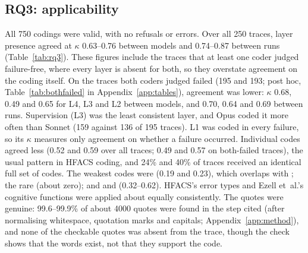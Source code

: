 \documentclass[11pt]{article}
\begin{document}
\subsection{RQ3: applicability}

All 750 codings were valid, with no refusals or errors. Over all 250 traces, layer presence agreed at $\kappa$ 0.63--0.76 between models and 0.74--0.87 between runs (Table~\ref{tab:rq3}). These figures include the traces that at least one coder judged failure-free, where every layer is absent for both, so they overstate agreement on the coding itself. On the traces both coders judged failed (195 and 193; post hoc, Table~\ref{tab:bothfailed} in Appendix~\ref{app:tables}), agreement was lower: $\kappa$ 0.68, 0.49 and 0.65 for L4, L3 and L2 between models, and 0.70, 0.64 and 0.69 between runs. Supervision (L3) was the least consistent layer, and Opus coded it more often than Sonnet (159 against 136 of 195 traces). L1 was coded in every failure, so its $\kappa$ measures only agreement on whether a failure occurred. Individual codes agreed less (0.52 and 0.59 over all traces; 0.49 and 0.57 on both-failed traces), the usual pattern in HFACS coding, and 24\% and 40\% of traces received an identical full set of codes. The weakest codes were  (0.19 and 0.23), which overlaps with
; the rare  (about zero); and  and 
(0.32--0.62). HFACS's error types and Ezell et~al.'s cognitive functions were
applied about equally consistently. The quotes were genuine: 99.6--99.9\% of about
\num{4000} quotes were found in the step cited (after normalising whitespace,
quotation marks and capitals; Appendix~\ref{app:method}), and none of the checkable
quotes was absent from the trace, though the check shows that the words exist, not
that they support the code.
\end{document}

